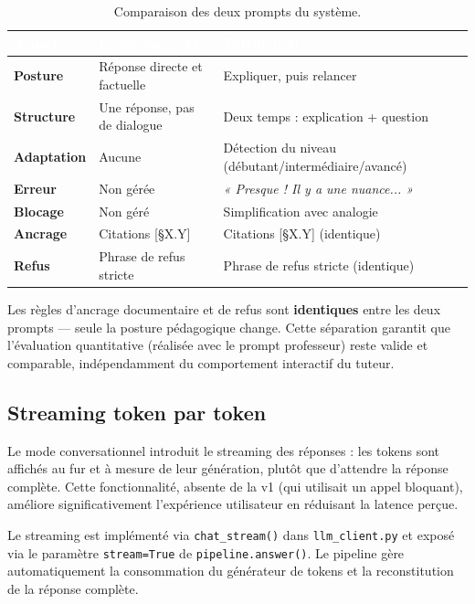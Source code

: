 \begin{table}[H]
\centering
\begin{tabularx}{\linewidth}{L{4.5cm} L{4cm} L{4cm}}
\toprule
{}
\textcolor{white}{\textbf{Aspect}} &
\textcolor{white}{\textbf{Professeur (v1)}} &
\textcolor{white}{\textbf{Tuteur (v2)}} \\
\midrule
\textbf{Posture}    & Réponse directe et factuelle & Expliquer, puis relancer \\
\textbf{Structure}  & Une réponse, pas de dialogue & Deux temps : explication + question \\
\textbf{Adaptation} & Aucune                      & Détection du niveau (débutant/intermédiaire/avancé) \\
\textbf{Erreur}     & Non gérée                   & \textit{« Presque ! Il y a une nuance... »} \\
\textbf{Blocage}    & Non géré                    & Simplification avec analogie \\
\textbf{Ancrage}    & Citations [\S{}X.Y]            & Citations [\S{}X.Y] (identique) \\
\textbf{Refus}      & Phrase de refus stricte     & Phrase de refus stricte (identique) \\
\bottomrule
\end{tabularx}
\caption{Comparaison des deux prompts du système.}
\label{tab:prompts}
\end{table}

Les règles d'ancrage documentaire et de refus sont \textbf{identiques} entre les deux prompts --- seule la posture pédagogique change. Cette séparation garantit que l'évaluation quantitative (réalisée avec le prompt professeur) reste valide et comparable, indépendamment du comportement interactif du tuteur.

\subsection{Streaming token par token}

Le mode conversationnel introduit le streaming des réponses : les tokens sont affichés au fur et à mesure de leur génération, plutôt que d'attendre la réponse complète. Cette fonctionnalité, absente de la v1 (qui utilisait un appel bloquant), améliore significativement l'expérience utilisateur en réduisant la latence perçue.

Le streaming est implémenté via \texttt{chat\_stream()} dans \texttt{llm\_client.py} et exposé via le paramètre \texttt{stream=True} de \texttt{pipeline.answer()}. Le pipeline gère automatiquement la consommation du générateur de tokens et la reconstitution de la réponse complète.

